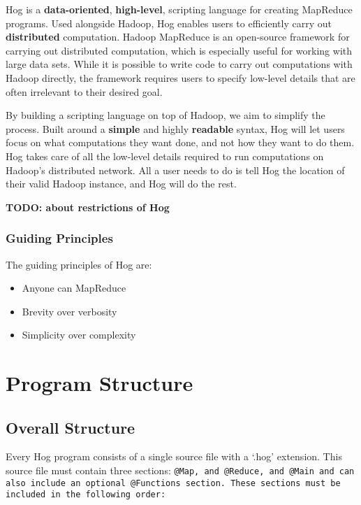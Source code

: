 \documentclass{book}
\begin{document}
Hog is a \textbf{data-oriented}, \textbf{high-level}, scripting language for
creating MapReduce programs. Used alongside Hadoop, Hog enables users to
efficiently carry out \textbf{distributed} computation. Hadoop MapReduce is an
open-source framework for carrying out distributed computation, which is especially
useful for working with large data sets. While it is possible to write code to
carry out computations with Hadoop directly, the framework requires users to
specify low-level details that are often irrelevant to their desired goal.

By building a scripting language on top of Hadoop, we aim to simplify the process.
Built around a \textbf{simple} and highly \textbf{readable} syntax, Hog will let
users focus on what computations they want done, and not how they want to do them.
Hog takes care of all the low-level details required to run computations on
Hadoop’s distributed network. All a user needs to do is tell Hog the location of
their valid Hadoop instance, and Hog will do the rest.

\textbf{TODO:  about restrictions of Hog}

\subsection{Guiding Principles} %
\label{sub:guiding_principles}

The guiding principles of Hog are:

\begin{itemize}
  \item Anyone can MapReduce
  \item Brevity over verbosity
  \item Simplicity over complexity
\end{itemize}



\chapter{Program Structure} %
\label{cha:program_structure}

\section{Overall Structure} %
\label{sec:overall_structure}

Every Hog program consists of a single source file with a ‘.hog’ extension. This
source file must contain three sections: \tt @Map\rm, and \tt @Reduce\rm, and
\tt @Main \rm and can also include an optional \tt @Functions \rm section. These
sections must be included in the following order:
\end{document}
